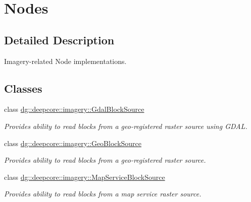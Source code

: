 \hypertarget{group___imagery_nodes}{}\section{Nodes}
\label{group___imagery_nodes}


\subsection{Detailed Description}
Imagery-\/related Node implementations. 

\subsection*{Classes}
\begin{DoxyCompactItemize}
\item 
class \hyperlink{classdg_1_1deepcore_1_1imagery_1_1_gdal_block_source}{dg\+::deepcore\+::imagery\+::\+Gdal\+Block\+Source}
\begin{DoxyCompactList}\small\item\em Provides ability to read blocks from a geo-\/registered raster source using G\+D\+AL. \end{DoxyCompactList}\item 
class \hyperlink{classdg_1_1deepcore_1_1imagery_1_1_geo_block_source}{dg\+::deepcore\+::imagery\+::\+Geo\+Block\+Source}
\begin{DoxyCompactList}\small\item\em Provides ability to read blocks from a geo-\/registered raster source. \end{DoxyCompactList}\item 
class \hyperlink{classdg_1_1deepcore_1_1imagery_1_1_map_service_block_source}{dg\+::deepcore\+::imagery\+::\+Map\+Service\+Block\+Source}
\begin{DoxyCompactList}\small\item\em Provides ability to read blocks from a map service raster source. \end{DoxyCompactList}\end{DoxyCompactItemize}
